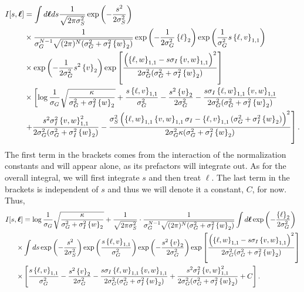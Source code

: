 \documentclass[11pt]{article}
\begin{document}
\begin{align}
I[s, \boldsymbol{\ell}] &= \int d\boldsymbol{\ell}ds \frac{1}{\sqrt{2\pi \sigma_S^2}}\exp\left(-\frac{s^2}{2\sigma_S^2}\right) \notag \\ 
& \times \frac{1}{\sigma_G^{N-1}\sqrt{(2\pi)^N(\sigma_G^2 + \sigma_I^2 \left\{w\right\}_2)}}\exp\left(-\frac{1}{2\sigma_G^2}\left\{\ell \right\}_2\right)\exp\left(\frac{1}{\sigma_G^2} s\left\{\ell, v\right\}_{1,1}\right)\notag \\
& \times \exp\left(-\frac{1}{2\sigma_G^2}s^2 \left\{v\right\}_2\right)\exp\left[\frac{\left(\left\{\ell, w\right\}_{1,1} - s \sigma_I \left\{v,w\right\}_{1,1}\right)^2}{2\sigma_G^2 (\sigma_G^2 + \sigma_I^2 \left\{w\right\}_2)}\right] \notag \\
& \times \left[\log \frac{1}{\sigma_G}\sqrt{\frac{\kappa}{\sigma_G^2 +\sigma_I^2 \left\{w\right\}_2}}  + \frac{s \left\{\ell, v\right\}_{1,1}}{\sigma_G^2} - \frac{s^2 \left\{v\right\}_2}{2\sigma_G^2} - \frac{s \sigma_I\left\{\ell, w\right\}_{1,1} \left\{v,w\right\}_{1,1}}{2\sigma_G^2 (\sigma_G^2 + \sigma_I^2 \left\{w\right\}_2)} \right. \notag \\
& \left. +\frac{s^2 \sigma_I^2\left\{v,w\right\}_{1,1}^2}{2\sigma_G^2 (\sigma_G^2 + \sigma_I^2 \left\{w\right\}_2)} -\frac{\sigma_S^2\left(\left\{\ell,w\right\}_{1,1} \left\{v,w\right\}_{1,1} \sigma_I - \left\{\ell, v\right\}_{1,1} (\sigma_G^2 +\sigma_I^2 \left\{w\right\}_2)\right)^2}{2\sigma_G^2 \kappa (\sigma_G^2 + \sigma_I^2 \left\{w\right\}_2)}  \right].
\end{align}
The first term in the brackets comes from the interaction of the normalization constants and will appear alone, as its prefactors will integrate out. As for the overall integral, we will first integrate $s$ and then treat $\boldsymbol{\ell}$. The last term in the brackets is independent of $s$ and thus we will denote it a constant, $C$, for now. Thus,
\begin{align}
	I[s,\boldsymbol{\ell}] &= \log \frac{1}{\sigma_G}\sqrt{\frac{\kappa}{\sigma_G^2 +\sigma_I^2 \left\{w\right\}_2}}  +\frac{1}{\sqrt{2\pi \sigma_S^2}}\cdot \frac{1}{\sigma_G^{N-1}\sqrt{(2\pi)^N(\sigma_G^2 + \sigma_I^2 \left\{w\right\}_2)}} \int d\boldsymbol{\ell} \exp\left(-\frac{\left\{\ell \right\}_2}{2\sigma_G^2}\right) \notag \\
	 \times & \int ds \exp\left(-\frac{s^2}{2\sigma_S^2}\right)\exp\left(\frac{s\left\{\ell, v\right\}_{1,1}}{\sigma_G^2} \right)\exp\left(-\frac{s^2 \left\{v\right\}_2}{2\sigma_G^2}\right)\exp\left[\frac{\left(\left\{\ell, w\right\}_{1,1} - s \sigma_I \left\{v,w\right\}_{1,1}\right)^2}{2\sigma_G^2 (\sigma_G^2 + \sigma_I^2 \left\{w\right\}_2)}\right] \notag \\
	 \times & \left[\frac{s \left\{\ell, v\right\}_{1,1}}{\sigma_G^2} - \frac{s^2 \left\{v\right\}_2}{2\sigma_G^2} - \frac{s \sigma_I\left\{\ell, w\right\}_{1,1} \left\{v,w\right\}_{1,1}}{2\sigma_G^2 (\sigma_G^2 + \sigma_I^2 \left\{w\right\}_2)}+\frac{s^2 \sigma_I^2\left\{v,w\right\}_{1,1}^2}{2\sigma_G^2 (\sigma_G^2 + \sigma_I^2 \left\{w\right\}_2)} + C\right].
\end{align}
\end{document}
